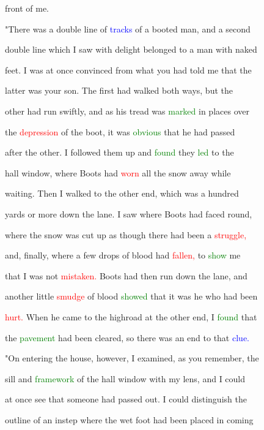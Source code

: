  front of me.



 "There was a double line of \textcolor{blue}{tracks} of a booted man, and a second

 double line which I saw with \textcolor{BurntOrange}{delight} belonged to a man with naked

 feet. I was at once \textcolor{BurntOrange}{convinced} from what you had told me that the

 latter was your son. The first had walked both ways, but the

 other had run swiftly, and as his tread was \textcolor{green}{marked} in places over

 the \textcolor{red}{depression} of the boot, it was \textcolor{green}{obvious} that he had passed

 after the other. I followed them up and \textcolor{green}{found} they \textcolor{green}{led} to the

 hall window, where Boots had \textcolor{red}{worn} all the snow away while

 \textcolor{BurntOrange}{waiting.} Then I walked to the other end, which was a hundred

 yards or more down the lane. I saw where Boots had faced round,

 where the snow was cut up as though there had been a \textcolor{red}{struggle,}

 and, \textcolor{BurntOrange}{finally,} where a few drops of blood had \textcolor{red}{fallen,} to \textcolor{green}{show} me

 that I was not \textcolor{red}{mistaken.} Boots had then run down the lane, and

 another little \textcolor{red}{smudge} of blood \textcolor{green}{showed} that it was he who had been

 \textcolor{red}{hurt.} When he came to the highroad at the other end, I \textcolor{green}{found} that

 the \textcolor{green}{pavement} had been cleared, so there was an end to that \textcolor{blue}{clue.}



 "On entering the house, however, I examined, as you remember, the

 sill and \textcolor{green}{framework} of the hall window with my lens, and I could

 at once see that someone had passed out. I could distinguish the

 outline of an instep where the wet foot had been placed in coming

